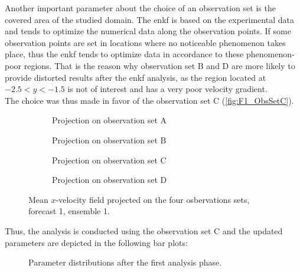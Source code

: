 \documentclass[12pt,twoside]{report}
\begin{document}
Another important parameter about the choice of an observation set is the covered area of the studied domain. The \gls{enkf} is based on the experimental data and tends to optimize the numerical data along the observation points. If some observation points are set in locations where no noticeable phenomenon takes place, thus the \gls{enkf} tends to optimize data in accordance to these phenomenon-poor regions. That is the reason why observation set B and D are more likely to provide distorted results after the \gls{enkf} analysis, as the region located at $-2.5<y<-1.5$ is not of interest and has a very poor velocity gradient. \\

The choice was thus made in favor of the observation set C (\autoref{fig:F1_ObsSetC}). %

\begin{figure}[h!]
  \begin{subfigure}[t]{.48\textwidth}
    \centering
    
    \caption{Projection on observation set A}
    \label{fig:F1_ObsSetA}
  \end{subfigure}
  \hfill
  \begin{subfigure}[t]{.48\textwidth}
    \centering
    
    \caption{Projection on observation set B}
    \label{fig:F1_ObsSetB}
  \end{subfigure}

    \medskip

  \begin{subfigure}[t]{.48\textwidth}
    \centering
    
    \caption{Projection on observation set C}
    \label{fig:F1_ObsSetC}
  \end{subfigure}
  \hfill
  \begin{subfigure}[t]{.48\textwidth}
    \centering
    
    \caption{Projection on observation set D}
    \label{fig:F1_ObsSetD}
  \end{subfigure}
  \caption{Mean $x$-velocity field projected on the four osbervations sets, forecast 1, ensemble 1.}
  \label{fig:Forecast1_Ensemble1}
\end{figure}

\clearpage

Thus, the analysis is conducted using the observation set C and the updated parameters are depicted in the following bar plots:
\begin{figure}[h!]
    \centering
    
    \caption{Parameter distributions after the first analysis phase.}
    \label{fig:ObsSetC_Analysis1_noInflation}
\end{figure}
\end{document}
